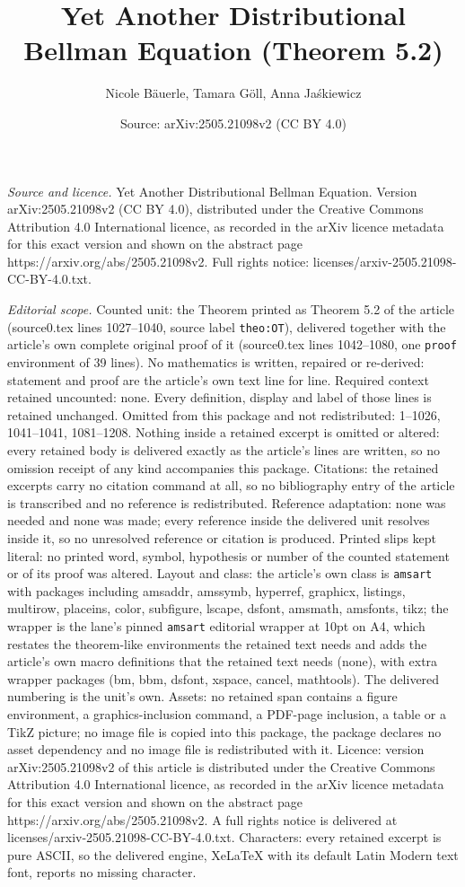 \documentclass[10pt,a4paper]{amsart}
\title[Yet Another Distributional Bellman Equation]{Yet Another Distributional Bellman Equation (Theorem 5.2)}
\author{Nicole B\"auerle, Tamara G\"oll, Anna Ja\'skiewicz}
\date{Source: arXiv:2505.21098v2 (CC BY 4.0)}
\begin{document}
\maketitle

\noindent\emph{Source and licence.} Yet Another Distributional Bellman Equation. Version arXiv:2505.21098v2 (CC BY 4.0), distributed under the Creative Commons Attribution 4.0 International licence, as recorded in the arXiv licence metadata for this exact version and shown on the abstract page https://arxiv.org/abs/2505.21098v2. Full rights notice: licenses/arxiv-2505.21098-CC-BY-4.0.txt.\par\smallskip

\noindent\textit{Editorial scope.} Counted unit: the Theorem printed as Theorem 5.2 of the article (source0.tex lines 1027--1040, source label \texttt{theo:OT}), delivered together with the article's own complete original proof of it (source0.tex lines 1042--1080, one \texttt{proof} environment of 39 lines). No mathematics is written, repaired or re-derived: statement and proof are the article's own text line for line. Required context retained uncounted: none. Every definition, display and label of those lines is retained unchanged. Omitted from this package and not redistributed: 1--1026, 1041--1041, 1081--1208. Nothing inside a retained excerpt is omitted or altered: every retained body is delivered exactly as the article's lines are written, so no omission receipt of any kind accompanies this package. Citations: the retained excerpts carry no citation command at all, so no bibliography entry of the article is transcribed and no reference is redistributed. Reference adaptation: none was needed and none was made; every reference inside the delivered unit resolves inside it, so no unresolved reference or citation is produced. Printed slips kept literal: no printed word, symbol, hypothesis or number of the counted statement or of its proof was altered. Layout and class: the article's own class is \texttt{amsart} with packages including amsaddr, amssymb, hyperref, graphicx, listings, multirow, placeins, color, subfigure, lscape, dsfont, amsmath, amsfonts, tikz; the wrapper is the lane's pinned \texttt{amsart} editorial wrapper at 10pt on A4, which restates the theorem-like environments the retained text needs and adds the article's own macro definitions that the retained text needs (none), with extra wrapper packages (bm, bbm, dsfont, xspace, cancel, mathtools). The delivered numbering is the unit's own. Assets: no retained span contains a figure environment, a graphics-inclusion command, a PDF-page inclusion, a table or a TikZ picture; no image file is copied into this package, the package declares no asset dependency and no image file is redistributed with it. Licence: version arXiv:2505.21098v2 of this article is distributed under the Creative Commons Attribution 4.0 International licence, as recorded in the arXiv licence metadata for this exact version and shown on the abstract page https://arxiv.org/abs/2505.21098v2. A full rights notice is delivered at licenses/arxiv-2505.21098-CC-BY-4.0.txt. Characters: every retained excerpt is pure ASCII, so the delivered engine, XeLaTeX with its default Latin Modern text font, reports no missing character.
\end{document}
